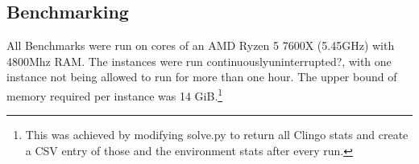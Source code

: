 \subsection{Benchmarking}
All Benchmarks were run on cores of an AMD Ryzen 5 7600X (5.45GHz) with 4800Mhz RAM. The instances were run continuously\color{red}uninterrupted?\color{black}, with one instance not being allowed to run for more than one hour. The upper bound of memory required per instance was 14 GiB.\footnote{This was achieved by modifying solve.py to return all Clingo stats and create a CSV entry of those and the environment stats after every run.}

